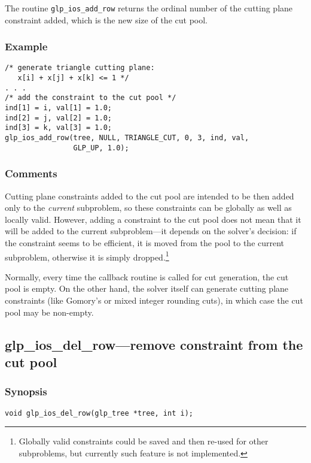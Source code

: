The routine \verb|glp_ios_add_row| returns the ordinal number of the
cutting plane constraint added, which is the new size of the cut pool.

\subsubsection*{Example}

\begin{verbatim}
/* generate triangle cutting plane:
   x[i] + x[j] + x[k] <= 1 */
. . .
/* add the constraint to the cut pool */
ind[1] = i, val[1] = 1.0;
ind[2] = j, val[2] = 1.0;
ind[3] = k, val[3] = 1.0;
glp_ios_add_row(tree, NULL, TRIANGLE_CUT, 0, 3, ind, val,
                GLP_UP, 1.0);
\end{verbatim}

\subsubsection*{Comments}

Cutting plane constraints added to the cut pool are intended to be then
added only to the {\it current} subproblem, so these constraints can be
globally as well as locally valid. However, adding a constraint to the
cut pool does not mean that it will be added to the current
subproblem---it depends on the solver's decision: if the constraint
seems to be efficient, it is moved from the pool to the current
subproblem, otherwise it is simply dropped.\footnote{Globally valid
constraints could be saved and then re-used for other subproblems, but
currently such feature is not implemented.}

Normally, every time the callback routine is called for cut generation,
the cut pool is empty. On the other hand, the solver itself can generate
cutting plane constraints (like Gomory's or mixed integer rounding
cuts), in which case the cut pool may be non-empty.

\subsection{glp\_ios\_del\_row---remove constraint from the cut pool}

\subsubsection*{Synopsis}

\begin{verbatim}
void glp_ios_del_row(glp_tree *tree, int i);
\end{verbatim}

